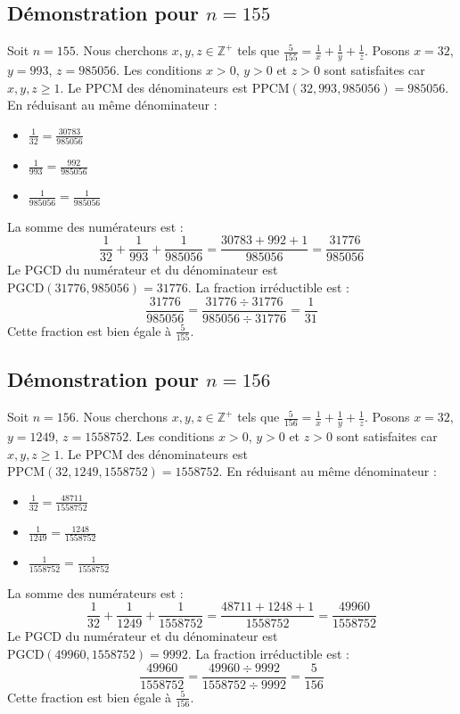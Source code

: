 \documentclass[11pt,a4paper]{article}
\begin{document}
\subsection{Démonstration pour $n = 155$}
Soit $n = 155$. Nous cherchons $x, y, z \in \mathbb{Z}^{+}$ tels que $\frac{5}{155} = \frac{1}{x} + \frac{1}{y} + \frac{1}{z}$.
Posons $x = 32$, $y = 993$, $z = 985056$.
Les conditions $x > 0$, $y > 0$ et $z > 0$ sont satisfaites car $x, y, z \geq 1$.
Le PPCM des dénominateurs est $\text{PPCM}(32, 993, 985056) = 985056$.
En réduisant au même dénominateur :
\begin{itemize}
    \item $\frac{1}{32} = \frac{30783}{985056}$
    \item $\frac{1}{993} = \frac{992}{985056}$
    \item $\frac{1}{985056} = \frac{1}{985056}$
\end{itemize}
La somme des numérateurs est :
$$ \frac{1}{32} + \frac{1}{993} + \frac{1}{985056} = \frac{30783 + 992 + 1}{985056} = \frac{31776}{985056} $$
Le PGCD du numérateur et du dénominateur est $\text{PGCD}(31776, 985056) = 31776$.
La fraction irréductible est :
$$ \frac{31776}{985056} = \frac{31776 \div 31776}{985056 \div 31776} = \frac{1}{31} $$
Cette fraction est bien égale à $\frac{5}{155}$.

\subsection{Démonstration pour $n = 156$}
Soit $n = 156$. Nous cherchons $x, y, z \in \mathbb{Z}^{+}$ tels que $\frac{5}{156} = \frac{1}{x} + \frac{1}{y} + \frac{1}{z}$.
Posons $x = 32$, $y = 1249$, $z = 1558752$.
Les conditions $x > 0$, $y > 0$ et $z > 0$ sont satisfaites car $x, y, z \geq 1$.
Le PPCM des dénominateurs est $\text{PPCM}(32, 1249, 1558752) = 1558752$.
En réduisant au même dénominateur :
\begin{itemize}
    \item $\frac{1}{32} = \frac{48711}{1558752}$
    \item $\frac{1}{1249} = \frac{1248}{1558752}$
    \item $\frac{1}{1558752} = \frac{1}{1558752}$
\end{itemize}
La somme des numérateurs est :
$$ \frac{1}{32} + \frac{1}{1249} + \frac{1}{1558752} = \frac{48711 + 1248 + 1}{1558752} = \frac{49960}{1558752} $$
Le PGCD du numérateur et du dénominateur est $\text{PGCD}(49960, 1558752) = 9992$.
La fraction irréductible est :
$$ \frac{49960}{1558752} = \frac{49960 \div 9992}{1558752 \div 9992} = \frac{5}{156} $$
Cette fraction est bien égale à $\frac{5}{156}$.
\end{document}
